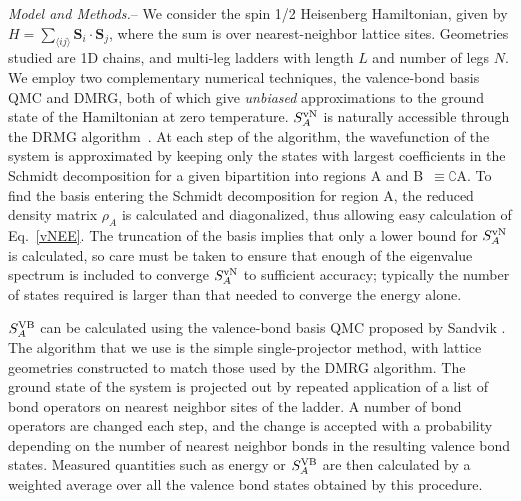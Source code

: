 \documentclass[prl,aps,twocolumn,floatfix,amsmath,amssymb,superscriptaddress,tightenlines]{revtex4}
\begin{document}
{\it Model and Methods.}-- We consider the spin 1/2 Heisenberg
Hamiltonian, given by  $H =  \sum_{\langle i j \rangle} {\mathbf S}_i
\cdot {\mathbf S}_j \label{ham}$, where the sum is over nearest-neighbor lattice
sites.  Geometries studied are 1D chains, and multi-leg ladders with
length $L$ and number of legs $N$.  
We employ two complementary numerical techniques, the valence-bond basis QMC and DMRG, both of
which give {\it unbiased} approximations to the ground state of the
Hamiltonian at zero temperature.  $S^{ \rm vN}_A$ is naturally accessible
through the DRMG 
algorithm~\cite{White92}.  At each
step of the algorithm, the wavefunction of the system is approximated by
keeping only the states with largest coefficients in the Schmidt
decomposition for a given bipartition into regions A and
B~$\equiv\complement$A. To find the
basis entering the Schmidt decomposition for region A, the reduced
density matrix $\rho_A$ is calculated and diagonalized, thus allowing easy
calculation of Eq.~\eqref{vNEE}. The truncation of the basis implies that
only a lower bound for $S^{\rm vN}_A$ is calculated, so care must be taken
to ensure that enough of the eigenvalue spectrum is included to converge
$S^{ \rm vN}_A$ to sufficient accuracy; typically the number of states required
is larger than that needed to converge the energy alone.

$S^{\rm VB}_A$ \cite{Alet,Chh} can be calculated using the valence-bond basis
QMC proposed by Sandvik \cite{Sandvik}.  The 
algorithm that we use is the simple single-projector method, with lattice
geometries constructed to match those used by the DMRG algorithm.  The
ground state of the system is projected out by repeated application of a
list of bond operators on nearest neighbor sites of the ladder.  A number
of bond operators are changed each step, and the change is accepted
with a probability depending on the number of nearest neighbor bonds in
the resulting valence bond states. Measured quantities such as energy or
$S^{\rm VB}_A$ are then calculated by a weighted average over all the valence bond
states obtained by this procedure.
\end{document}
